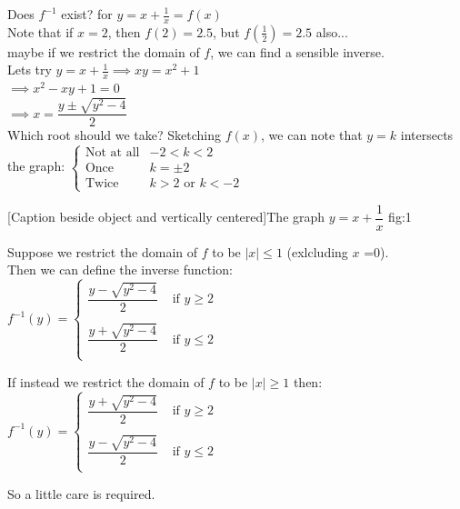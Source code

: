 \begin{example} Does $f^{-1}$ exist? for $y = x + \frac{1}{x} = f(x)$\\

Note that if $x = 2$, then $f(2) = 2.5$, but $f(\frac{1}{2}) = 2.5$ also...\\
maybe if we restrict the domain of $f$, we can find a sensible inverse.\\

Lets try $y = x + \frac{1}{x} \implies xy = x^2 + 1$\\

$\implies x^2 - xy + 1 = 0$\\

$\implies x = \dfrac{y \pm \sqrt{y^2 -4}}{2}$\\

Which root should we take? Sketching $f(x)$, we can note that $y = k$ intersects the graph: $\begin{cases}
\text{Not at all}& -2 < k< 2\\
\text{Once} & k = \pm 2\\
\text{Twice} & k>2 \text{ or } k<-2
\end{cases}$



[Caption beside object and vertically centered]{The graph $y = x + \dfrac{1}{x}$
}{fig:1}


\vspace{5pt}

Suppose we restrict the domain of $f$ to be $|x| \leq 1$ (exlcluding $x$ =0).\\

Then we can define the inverse function:\\

$f^{-1}(y) = \begin{cases}
 \dfrac{y - \sqrt{y^2 -4}}{2} & \text{ if } y \geq 2 \\\\
 \dfrac{y + \sqrt{y^2 -4}}{2} & \text{ if } y \leq 2 \\

 \end{cases}
 $

If instead we restrict the domain of $f$ to be $|x| \geq 1$ then:
$f^{-1}(y) = \begin{cases}
 \dfrac{y + \sqrt{y^2 -4}}{2} & \text{ if } y \geq 2 \\\\
 \dfrac{y - \sqrt{y^2 -4}}{2} & \text{ if } y \leq 2 \\

 \end{cases}
 $

So a little care is required.\\
\end{example}

